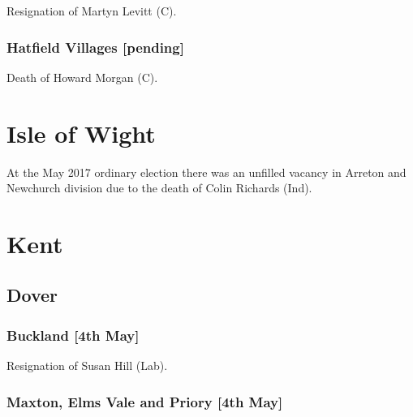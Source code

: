\documentclass[a4paper,openany]{book}
\begin{document}
\begin{resultsiii}

Resignation of Martyn Levitt (C).

\subsubsection*{Hatfield Villages \hspace*{\fill}\nolinebreak[1]%
\enspace\hspace*{\fill}
[pending]}


Death of Howard Morgan (C).

\section{Isle of Wight}

At the May 2017 ordinary election there was an unfilled vacancy in Arreton and Newchurch division due to the death of Colin Richards (Ind).

\section{Kent}

\subsection*{Dover}

\subsubsection*{Buckland \hspace*{\fill}\nolinebreak[1]%
\enspace\hspace*{\fill}
[4th May]}


Resignation of Susan Hill (Lab).

\subsubsection*{Maxton, Elms Vale and Priory \hspace*{\fill}\nolinebreak[1]%
\enspace\hspace*{\fill}
[4th May]}


\end{resultsiii}
\end{document}
